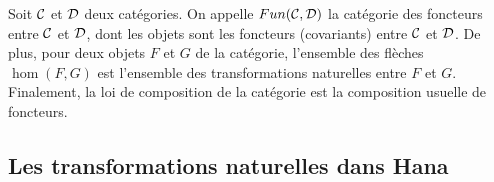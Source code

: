 \begin{définition}
    Soit $\mathcal{C}$ et $\mathcal{D}$ deux catégories. On appelle $Fun(\mathcal{C}, \mathcal{D})$ la catégorie
    des foncteurs entre $\mathcal{C}$ et $\mathcal{D}$, dont les objets sont les foncteurs
    (covariants) entre $\mathcal{C}$ et $\mathcal{D}$. De plus, pour deux objets $F$ et $G$ de
    la catégorie, l'ensemble des flèches $\hom(F, G)$ est l'ensemble des
    transformations naturelles entre $F$ et $G$. Finalement, la loi de
    composition de la catégorie est la composition usuelle de foncteurs.
\end{définition}


\subsection{Les transformations naturelles dans Hana}
